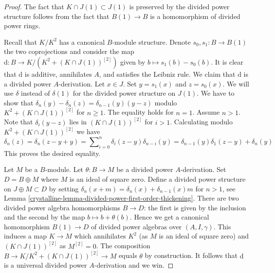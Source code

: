 \begin{proof}

The fact that $K \cap J(1) \subset J(1)$ is preserved by the divided power
structure follows from the fact that $B(1) \to B$ is a homomorphism of
divided power rings.

\medskip\noindent
Recall that $K/K^2$ has a canonical $B$-module structure.
Denote $s_0, s_1 : B \to B(1)$ the two coprojections and consider
the map $\text{d} : B \to K/(K^2 +(K \cap J(1))^{[2]})$ given by
$b \mapsto s_1(b) - s_0(b)$. It is clear that $\text{d}$ is additive,
annihilates $A$, and satisfies the Leibniz rule.
We claim that $\text{d}$ is a divided power $A$-derivation.
Let $x \in J$. Set $y = s_1(x)$ and $z = s_0(x)$.
We will use $\delta$ instead of $\delta(1)$ for
the divided power structure on $J(1)$.
We have to show that $\delta_n(y) - \delta_n(z) = \delta_{n - 1}(y)(y - z)$
modulo $K^2 +(K \cap J(1))^{[2]}$ for $n \geq 1$.
The equality holds for $n = 1$. Assume $n > 1$.
Note that $\delta_i(y - z)$ lies in $(K \cap J(1))^{[2]}$ for $i > 1$.
Calculating modulo $K^2 + (K \cap J(1))^{[2]}$ we have
$$
\delta_n(z) = \delta_n(z - y + y) =
\sum\nolimits_{i = 0}^n \delta_i(z - y)\delta_{n - i}(y) =
\delta_{n - 1}(y) \delta_1(z - y) + \delta_n(y)
$$
This proves the desired equality.

\medskip\noindent
Let $M$ be a $B$-module. Let $\theta : B \to M$ be a divided power
$A$-derivation.
Set $D = B \oplus M$ where $M$ is an ideal of square zero. Define a
divided power structure on $J \oplus M \subset D$ by setting
$\delta_n(x + m) = \delta_n(x) + \delta_{n - 1}(x)m$ for $n > 1$, see
Lemma \ref{crystalline-lemma-divided-power-first-order-thickening}.
There are two divided power algebra homomorphisms $B \to D$: the first
is given by the inclusion and the second by the map $b \mapsto b + \theta(b)$.
Hence we get a canonical homomorphism $B(1) \to D$ of divided power
algebras over $(A, I, \gamma)$. This induces a map $K \to M$
which annihilates $K^2$ (as $M$ is an ideal of square zero) and
$(K \cap J(1))^{[2]}$ as $M^{[2]} = 0$. The composition
$B \to K/K^2 + (K \cap J(1))^{[2]} \to M$ equals $\theta$ by construction.
It follows that $\text{d}$
is a universal divided power $A$-derivation and we win.
\end{proof}


